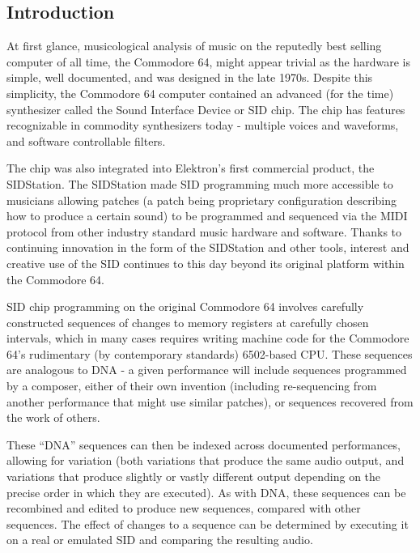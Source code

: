 \documentclass[10pt]{article}
\begin{document}
\begin{multicols*}{2}

  \section{Introduction}

  At first glance, musicological analysis of music on the reputedly best selling computer of all time, the Commodore 64\cite{ieeec64}, might appear trivial as the hardware is simple, well documented, and was designed in the late 1970s. Despite this simplicity, the Commodore 64 computer contained an advanced (for the time) synthesizer called the Sound Interface Device\cite{sidpatent} or SID chip. The chip has features recognizable in commodity synthesizers today - multiple voices and waveforms, and software controllable filters.

  The chip was also integrated into Elektron’s first commercial product, the SIDStation\cite{sidstation}.  The SIDStation made SID programming much more accessible to musicians allowing patches (a patch being proprietary configuration describing how to produce a certain sound) to be programmed and sequenced via the MIDI protocol from other industry standard music hardware and software. Thanks to continuing innovation in the form of the SIDStation and other tools, interest and creative use of the SID continues to this day beyond its original platform within the Commodore 64.

SID chip programming on the original Commodore 64 involves carefully constructed sequences of changes to memory registers at carefully chosen intervals, which in many cases requires writing machine code for the Commodore 64's rudimentary (by contemporary standards) 6502-based CPU. These sequences are analogous to DNA - a given performance will include sequences programmed by a composer, either of their own invention (including re-sequencing from another performance that might use similar patches), or sequences recovered from the work of others.

These “DNA” sequences can then be indexed across documented performances, allowing for variation (both variations that produce the same audio output, and variations that produce slightly or vastly different output depending on the precise order in which they are executed). As with DNA, these sequences can be recombined and edited to produce new sequences, compared with other sequences. The effect of changes to a sequence can be determined by executing it on a real or emulated SID and comparing the resulting audio.


\end{multicols*}
\end{document}
